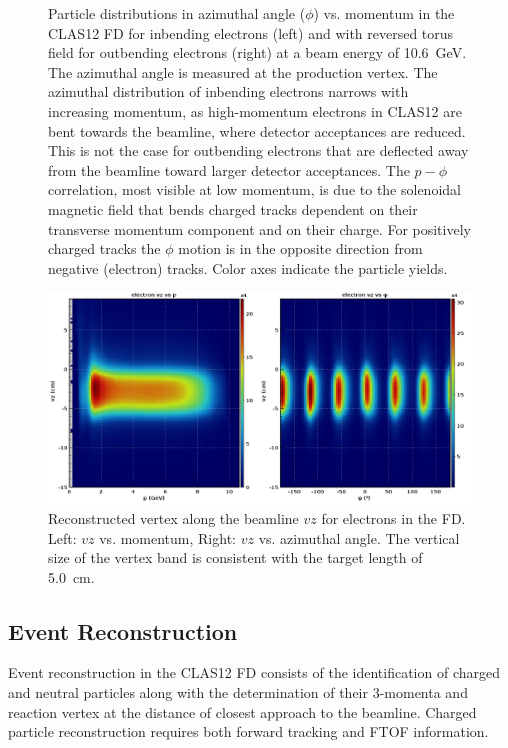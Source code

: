 \documentclass[final,3p,twocolumn]{elsarticle}
\begin{document}
\begin{figure}[h!]
\caption{Particle distributions in azimuthal angle ($\phi$) vs. momentum in the CLAS12 FD for inbending electrons
  (left) and with reversed torus field for outbending electrons (right) at a beam energy of 10.6~GeV. The azimuthal
  angle is measured at the production vertex. The azimuthal distribution of inbending electrons narrows with increasing
  momentum, as high-momentum electrons in CLAS12 are bent towards the beamline, where detector acceptances are
  reduced. This is not the case for outbending electrons that are deflected away from the beamline toward larger
  detector acceptances. The $p-\phi$ correlation, most visible at low momentum, is due to the solenoidal magnetic field
  that bends charged tracks dependent on their transverse momentum component and on their charge. For positively
  charged tracks the $\phi$ motion is in the opposite direction from negative (electron) tracks. Color axes indicate the
  particle yields.} 
\label{neg-pos}
\end{figure}
\begin{figure}[t!]
\centerline{\includegraphics[width=1.8\columnwidth]{e_vz.png}}
\caption{Reconstructed vertex along the beamline $vz$ for electrons in the FD. Left: $vz$ vs. momentum, Right: $vz$
  vs. azimuthal angle. The vertical size of the vertex band is consistent with the target length of 5.0~cm.} 
\label{vertex}
\end{figure}

\subsection{Event Reconstruction} 

Event reconstruction in the CLAS12 FD consists of the identification of charged and neutral particles along with the 
determination of their 3-momenta and reaction vertex at the distance of closest approach to the beamline. Charged
particle reconstruction requires both forward tracking and FTOF information. 
\end{document}
